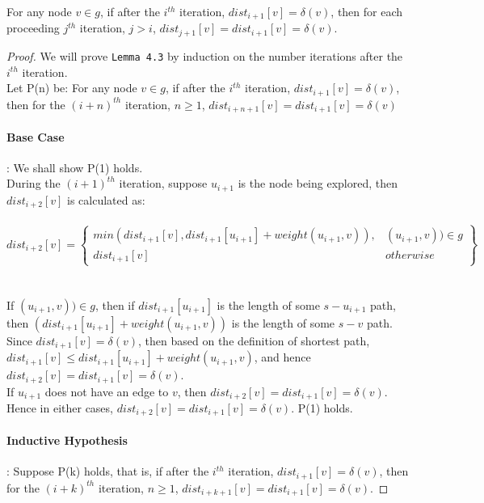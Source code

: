 \begin{sublemma}
For any node $v \in g$, if after the $i^{th}$ iteration, $dist_{i+1}[v] = \delta(v)$, then for each proceeding $j^{th}$ iteration, $j > i$, $dist_{j+1}[v] = dist_{i+1}[v] = \delta(v)$. 
\end{sublemma}
\begin{proof}
We will prove \texttt{Lemma 4.3} by induction on the number iterations after the $i^{th}$ iteration. 
\\
Let P(n) be: For any node $v \in g$, if after the $i^{th}$ iteration, $dist_{i+1}[v] = \delta(v)$, then for the $(i+n)^{th}$ iteration, $n \geq 1$, $dist_{i+n+1}[v] = dist_{i+1}[v] = \delta(v)$

\paragraph*{Base Case}: We shall show P(1) holds. 
\\
During the $(i+1)^{th}$ iteration, suppose $u_{i+1}$ is the node being explored, then $dist_{i+2}[v]$ is calculated as: 
\\\\
\tab\[
        dist_{i+2}[v] = \left.
       \begin{cases} 
          min(dist_{i+1}[v], dist_{i+1}[u_{i+1}] + weight(u_{i+1}, v)), & (u_{i+1}, v)) \in g \\ 
          dist_{i+1}[v] & otherwise 
        \end{cases}
        \right\}
      \]
\\\\
If $(u_{i+1}, v)) \in g $, then if $dist_{i+1}[u_{i+1}]$ is the length of some $s-u_{i+1}$ path, then $(dist_{i+1}[u_{i+1}] + weight(u_{i+1}, v))$ is the length of some $s-v$ path. Since $dist_{i+1}[v] = \delta(v)$, then based on the definition of shortest path, $dist_{i+1}[v] \leq dist_{i+1}[u_{i+1}] + weight(u_{i+1}, v)$, and hence $dist_{i+2}[v] = dist_{i+1}[v] = \delta(v)$. 
\\
If $u_{i+1}$ does not have an edge to $v$, then $dist_{i+2}[v] = dist_{i+1}[v] = \delta(v)$. 
\\
Hence in either cases, $dist_{i+2}[v] = dist_{i+1}[v] = \delta(v)$. P(1) holds. 


\paragraph*{Inductive Hypothesis}: Suppose P(k) holds, that is, if after the $i^{th}$ iteration, $dist_{i+1}[v] = \delta(v)$, then for the $(i+k)^{th}$ iteration, $n \geq 1$, $dist_{i+k+1}[v] = dist_{i+1}[v] = \delta(v)$. 



\end{proof}
